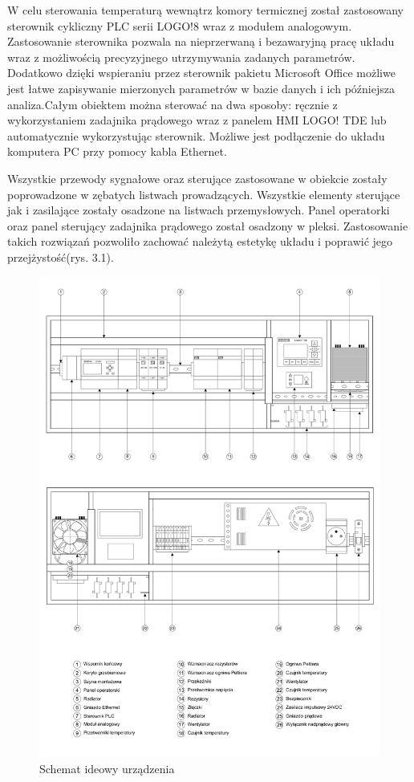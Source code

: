 \documentclass[oneside]{mgr}
\begin{document}
W celu sterowania temperaturą wewnątrz komory termicznej został zastosowany sterownik cykliczny PLC serii LOGO!8 wraz z modułem analogowym. Zastosowanie sterownika pozwala na nieprzerwaną i bezawaryjną pracę układu wraz z możliwością precyzyjnego utrzymywania zadanych parametrów. Dodatkowo dzięki wspieraniu przez sterownik pakietu Microsoft Office możliwe jest łatwe zapisywanie mierzonych parametrów w bazie danych i ich późniejsza analiza.Całym obiektem można sterować na dwa sposoby: ręcznie z wykorzystaniem zadajnika prądowego wraz z panelem HMI LOGO! TDE lub automatycznie wykorzystując sterownik. Możliwe jest podłączenie do układu komputera PC przy pomocy kabla Ethernet. 

Wszystkie przewody sygnałowe oraz sterujące zastosowane w obiekcie zostały poprowadzone w zębatych listwach prowadzących. Wszystkie elementy sterujące jak i zasilające zostały osadzone na listwach przemysłowych. Panel operatorki oraz panel sterujący zadajnika prądowego został osadzony w pleksi. Zastosowanie takich rozwiązań pozwoliło zachować należytą estetykę układu i poprawić jego przejżystość(rys. 3.1).

\begin{figure}
    \centering
    \includegraphics[width=\textwidth]{3.jpg}
    \caption{Schemat ideowy urządzenia}
\end{figure}
\end{document}

